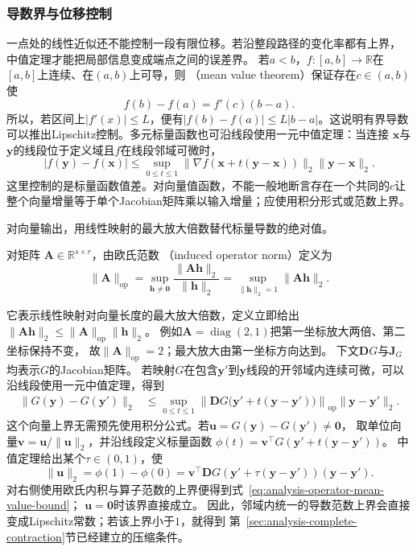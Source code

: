 \subsubsection{导数界与位移控制}

一点处的线性近似还不能控制一段有限位移。若沿整段路径的变化率都有上界，
中值定理才能把局部信息变成端点之间的误差界。
若$a<b$，$f:[a,b]\to\mathbb{R}$在$[a,b]$上连续、在$(a,b)$上可导，则
（mean value theorem）保证存在$c\in(a,b)$使
\begin{equation}
  f(b)-f(a)=f'(c)(b-a).
\label{eq:analysis-mean-value-theorem}
\end{equation}
所以，若区间上$|f'(x)|\leq L$，便有$|f(b)-f(a)|\leq L|b-a|$。这说明有界导数可以推出Lipschitz控制。多元标量函数也可沿线段使用一元中值定理：当连接 $\bm{x}$与$\bm{y}$的线段位于定义域且$f$在线段邻域可微时，
\[   |f(\bm{y})-f(\bm{x})|   \leq   \sup_{0\leq t\leq1}   \lVert\nabla f(\bm{x}+t(\bm{y}-\bm{x}))\rVert_2   \lVert\bm{y}-\bm{x}\rVert_2. \]
这里控制的是标量函数值差。对向量值函数，不能一般地断言存在一个共同的$c$让整个向量增量等于单个Jacobian矩阵乘以输入增量；应使用积分形式或范数上界。

对向量输出，用线性映射的最大放大倍数替代标量导数的绝对值。
\begin{definition}[欧氏诱导算子范数]
\label{def:analysis-induced-operator-norm}
对矩阵
$\bm{A}\in\mathbb{R}^{s\times r}$，由欧氏范数
（induced operator norm）定义为
\[
  \lVert\bm{A}\rVert_{\mathrm{op}}
  =
  \sup_{\bm{h}\neq\bm{0}}
  \frac{\lVert\bm{A}\bm{h}\rVert_2}{\lVert\bm{h}\rVert_2}
  =
  \sup_{\lVert\bm{h}\rVert_2=1}\lVert\bm{A}\bm{h}\rVert_2.
\]
\end{definition}
它表示线性映射对向量长度的最大放大倍数，定义立即给出
$\lVert\bm{A}\bm{h}\rVert_2
\leq\lVert\bm{A}\rVert_{\mathrm{op}}\lVert\bm{h}\rVert_2$。
例如$\bm A=\operatorname{diag}(2,1)$把第一坐标放大两倍、第二坐标保持不变，
故$\lVert\bm A\rVert_{\mathrm{op}}=2$；最大放大由第一坐标方向达到。
下文$\bm DG$与$\bm J_G$均表示$G$的Jacobian矩阵。
若映射$G$在包含$\bm{y}'$到$\bm{y}$线段的开邻域内连续可微，可以沿线段使用一元中值定理，得到
\begin{equation}
  \begin{aligned}
  \lVert G(\bm{y})-G(\bm{y}')\rVert_2
  &\leq
  \sup_{0\leq t\leq1}
  \left\lVert
    \bm{D}G\bigl(\bm{y}'+t(\bm{y}-\bm{y}')\bigr)
  \right\rVert_{\mathrm{op}}
  \lVert\bm{y}-\bm{y}'\rVert_2.
  \end{aligned}
\label{eq:analysis-operator-mean-value-bound}
\end{equation}
这个向量上界无需预先使用积分公式。若$\bm u=G(\bm y)-G(\bm y')\neq\bm0$，
取单位向量$\bm v=\bm u/\lVert\bm u\rVert_2$，并沿线段定义标量函数
$\phi(t)=\bm v^\top G(\bm y'+t(\bm y-\bm y'))$。
中值定理给出某个$\tau\in(0,1)$，使
\[
 \lVert\bm u\rVert_2
 =\phi(1)-\phi(0)
 =\bm v^\top\bm DG(\bm y'+\tau(\bm y-\bm y'))(\bm y-\bm y').
\]
对右侧使用欧氏内积与算子范数的上界便得到式~\eqref{eq:analysis-operator-mean-value-bound}；
$\bm u=\bm0$时该界直接成立。
因此，邻域内统一的导数范数上界会直接变成Lipschitz常数；若该上界小于$1$，就得到
第~\ref{sec:analysis-complete-contraction}节已经建立的压缩条件。

